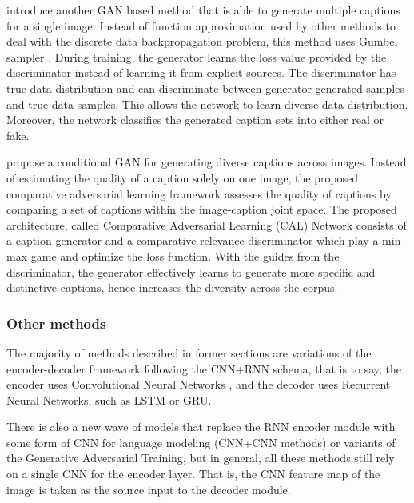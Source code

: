 \cite{Shetty2017} introduce another GAN based method that is able to generate multiple captions for a single image. Instead of function approximation used by other methods to deal with the discrete data backpropagation problem, this method uses Gumbel sampler \citep{Jang2017}. During training, the generator learns the loss value provided by the discriminator instead of learning it from explicit sources. The discriminator has true data distribution and can discriminate between generator-generated samples and true data samples. This allows the network to learn diverse data distribution. Moreover, the network classifies the generated caption sets into either real or fake.

\cite{Li2018_CAL} propose a conditional GAN for generating diverse captions across images. Instead of estimating the quality of a caption solely on one image, the proposed comparative adversarial learning framework assesses the quality of captions by comparing a set of captions within the image-caption joint space. The proposed architecture, called Comparative Adversarial Learning (CAL) Network consists of a caption generator and a comparative relevance discriminator which play a min-max game and optimize the loss function. With the guides from the discriminator, the generator effectively learns to generate more specific and distinctive captions, hence increases the diversity across the corpus.

\subsubsection{Other methods}

The majority of methods described in former sections are variations of the encoder-decoder framework following the CNN+RNN schema, that is to say, the encoder uses Convolutional Neural Networks \cite{Lecun1998}, and the decoder uses Recurrent Neural Networks, such as LSTM\citep{Hochreiter1997} or GRU\citep{Chung2014}.

There is also a new wave of models that replace the RNN encoder module with some form of CNN for language modeling (CNN+CNN methods) or variants of the Generative Adversarial Training, but in general, all these methods still rely on a single CNN for the encoder layer. That is, the CNN feature map of the image is taken as the source input to the decoder module.

